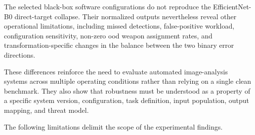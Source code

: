 The selected black-box software configurations do not reproduce the
EfficientNet-B0 direct-target collapse. Their normalized outputs nevertheless
reveal other operational limitations, including missed detections,
false-positive workload, configuration sensitivity, non-zero \gls{ood} weapon
assignment rates, and transformation-specific changes in the balance between
the two binary error directions.

These differences reinforce the need to evaluate automated image-analysis
systems across multiple operating conditions rather than relying on a single
clean benchmark. They also show that robustness must be understood as a
property of a specific system version, configuration, task definition, input
population, output mapping, and threat model.

The following limitations delimit the scope of the experimental findings.

